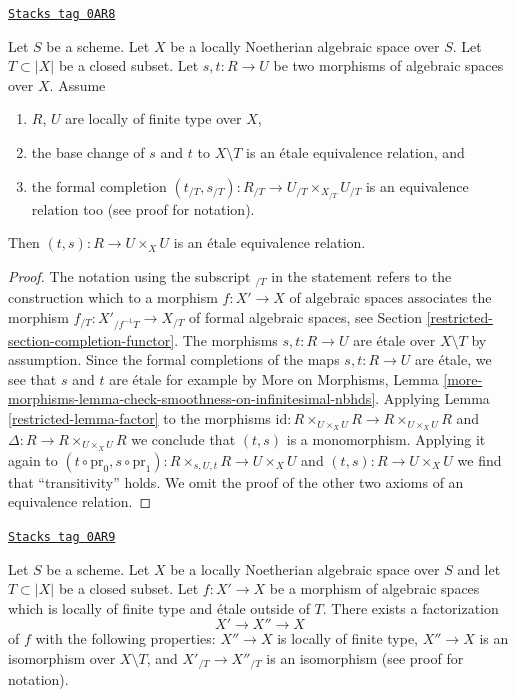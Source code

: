 \begin{lemma}
\label{restricted-lemma-equivalence-relation}
\href{https://stacks.math.columbia.edu/tag/0AR8}{\texttt{Stacks tag 0AR8}}

Let $S$ be a scheme. Let $X$ be a locally Noetherian algebraic space
over $S$. Let $T \subset |X|$ be a closed subset.
Let $s, t : R \to U$ be two morphisms of algebraic spaces over $X$.
Assume
\begin{enumerate}
\item $R$, $U$ are locally of finite type over $X$,
\item the base change of $s$ and $t$ to $X \setminus T$
is an \'etale equivalence relation, and
\item the formal completion
$(t_{/T}, s_{/T}) : R_{/T} \to U_{/T} \times_{X_{/T}} U_{/T}$
is an equivalence relation too (see proof for notation).
\end{enumerate}
Then $(t, s) : R \to U \times_X U$ is an \'etale equivalence relation.
\end{lemma}

\begin{proof}

The notation using the subscript ${}_{/T}$ in the statement refers to the
construction which to a morphism $f : X' \to X$ of algebraic spaces
associates the morphism $f_{/T} : X'_{/f^{-1}T} \to X_{/T}$ of formal
algebraic spaces, see Section \ref{restricted-section-completion-functor}.
The morphisms $s, t : R \to U$ are \'etale over $X \setminus T$
by assumption. Since the formal completions of the maps
$s, t : R \to U$ are \'etale, we see that $s$ and $t$ are \'etale
for example by More on Morphisms, Lemma
\ref{more-morphisms-lemma-check-smoothness-on-infinitesimal-nbhds}.
Applying Lemma \ref{restricted-lemma-factor} to the morphisms
$\text{id} : R \times_{U \times_X U} R \to R \times_{U \times_X U} R$
and $\Delta : R \to R \times_{U \times_X U} R$ we conclude that
$(t, s)$ is a monomorphism. Applying it again to
$(t \circ \text{pr}_0, s \circ \text{pr}_1) :
R \times_{s, U, t} R \to U \times_X U$ and $(t, s) : R \to U \times_X U$
we find that ``transitivity'' holds. We omit the proof of
the other two axioms of an equivalence relation.
\end{proof}

\begin{lemma}
\label{restricted-lemma-smash-away-from-T}
\href{https://stacks.math.columbia.edu/tag/0AR9}{\texttt{Stacks tag 0AR9}}

Let $S$ be a scheme. Let $X$ be a locally Noetherian algebraic space over $S$
and let $T \subset |X|$ be a closed subset. Let $f : X' \to X$ be a morphism
of algebraic spaces which is locally of finite type and \'etale outside of $T$.
There exists a factorization
$$
X' \longrightarrow X'' \longrightarrow X
$$
of $f$ with the following properties:
$X'' \to X$ is locally of finite type,
$X'' \to X$ is an isomorphism over $X \setminus T$, and
$X'_{/T} \to X''_{/T}$ is an isomorphism (see proof for notation).
\end{lemma}

